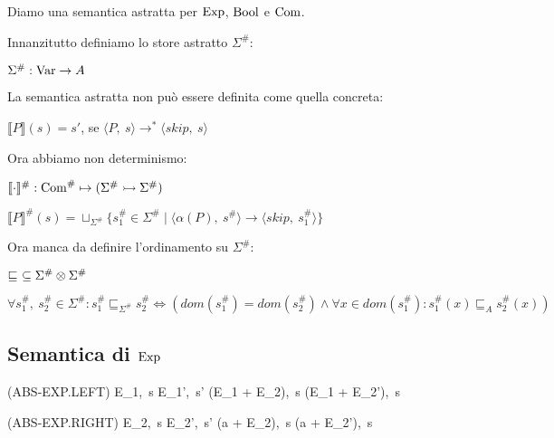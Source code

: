 Diamo una semantica astratta per $\mathrm{Exp}$, $\mathrm{Bool}$ e $\mathrm{Com}$.

Innanzitutto definiamo lo store astratto $\Sigma^\#:$

\begin{center}
	$ \Sigma^\# : \mathrm{Var} \rightarrow A $
\end{center}

La semantica astratta non può essere definita come quella concreta:
\begin{center}
	$ \llbracket P \rrbracket (s) = s' $, se $ \langle P,\ s \rangle \rightarrow^* \langle skip,\ s \rangle $
\end{center}

Ora abbiamo non determinismo:
\begin{center}
	$ \llbracket \cdot \rrbracket^\# : \mathrm{Com}^\# \mapsto (\Sigma^\# \rightarrowtail \Sigma^\#) $
\end{center}

\begin{center}
	$ \llbracket P \rrbracket^\# (s) =  \sqcup _{\Sigma^\#} \{ s^\#_1 \in \Sigma^\# \mid \langle \alpha(P),\ s^\# \rangle \rightarrow \langle skip,\ s^\#_1 \rangle \} $
\end{center}

Ora manca da definire l'ordinamento su $ \Sigma^\# $:
\begin{center}
	$ \sqsubseteq\ \subseteq \Sigma^\# \otimes \Sigma^\# $
\end{center}

\begin{center}
	$ \forall s_1^\#,\ s_2^\# \in \Sigma^\# : s_1^\# \sqsubseteq_{\Sigma^\#} s_2^\# \iff ( dom(s_1^\#) = dom(s_2^\#) \wedge \forall x \in dom(s_1^\#) : s_1^\#(x) \sqsubseteq_A s_2^\#(x) ) $
\end{center}

\subsection{Semantica di $\mathrm{Exp}$}

\begin{center}
	(ABS-EXP.LEFT)
	\prooftree
		\langle E_1,\ s \rangle \rightarrow \langle E_1',\ s' \rangle
		\justifies
		\langle (E_1 + E_2),\ s \rangle \rightarrow \langle (E_1 + E_2'),\ s \rangle		
	\endprooftree
\end{center}

\begin{center}
	(ABS-EXP.RIGHT)
	\prooftree
		\langle E_2,\ s \rangle \rightarrow \langle E_2',\ s' \rangle
		\justifies
		\langle (a + E_2),\ s \rangle \rightarrow \langle (a + E_2'),\ s\rangle
	\endprooftree
\end{center}

